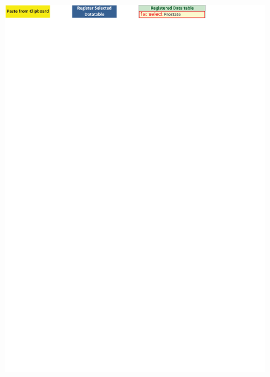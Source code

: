 \documentclass[article]{jss}
\begin{document}
        \begin{figure}[!tbh]
          \includegraphics[width=\linewidth, keepaspectratio=true]{img/DataSheet_Prostate_header_markup}

\end{figure}
\end{document}

